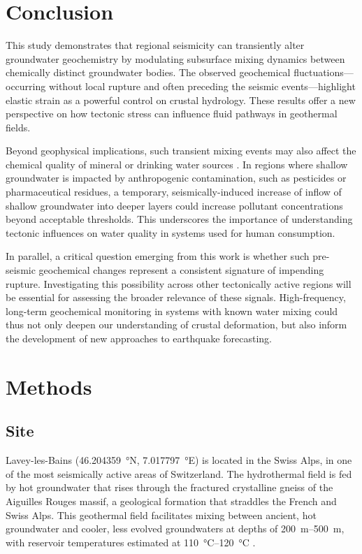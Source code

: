 \section{Conclusion}
This study demonstrates that regional seismicity can transiently alter groundwater geochemistry by modulating subsurface mixing dynamics between chemically distinct groundwater bodies.
The observed geochemical fluctuations---occurring without local rupture and often preceding the seismic events---highlight elastic strain as a powerful control on crustal hydrology.
These results offer a new perspective on how tectonic stress can influence fluid pathways in geothermal fields.

Beyond geophysical implications, such transient mixing events may also affect the chemical quality of mineral or drinking water sources \citep{kiefer2020pollution}.
In regions where shallow groundwater is impacted by anthropogenic contamination, such as pesticides or pharmaceutical residues, a temporary, seismically-induced increase of inflow of shallow groundwater into deeper layers could increase pollutant concentrations beyond acceptable thresholds.
This underscores the importance of understanding tectonic influences on water quality in systems used for human consumption.

In parallel, a critical question emerging from this work is whether such pre-seismic geochemical changes represent a consistent signature of impending rupture.
Investigating this possibility across other tectonically active regions will be essential for assessing the broader relevance of these signals.
High-frequency, long-term geochemical monitoring in systems with known water mixing could thus not only deepen our understanding of crustal deformation, but also inform the development of new approaches to earthquake forecasting.

\section{Methods}
\subsection{Site}
Lavey-les-Bains (\SI{46.204359}{\degree}N, \SI{7.017797}{\degree}E) is located in the Swiss Alps, in one of the most seismically active areas of Switzerland.
The hydrothermal field is fed by hot groundwater that rises through the fractured crystalline gneiss of the Aiguilles Rouges massif, a geological formation that straddles the French and Swiss Alps.
This geothermal field facilitates mixing between ancient, hot groundwater and cooler, less evolved groundwaters at depths of \SIrange{200}{500}{\meter}, with reservoir temperatures estimated at \SIrange{110}{120}{\celsius} \citep{sonney2009numerical, wanner2019quantification, giroud2025microbio}.

